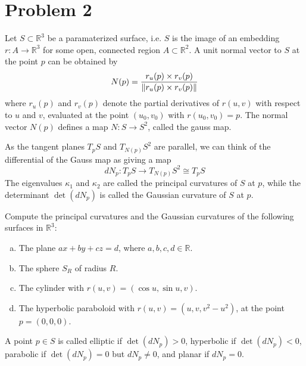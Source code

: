 \documentclass[a4paper]{article}
\begin{document}
\section*{Problem 2}%
Let $S \subset \mathds{R}^3$ be a paramaterized surface, i.e. $S$ is the image of an embedding $r: A \rightarrow \mathds{R}^3$ for some open, connected region $A \subset \mathds{R}^2$. A unit normal vector to $S$ at the point $p$ can be obtained by
\[
  N(p) = \frac{r_u(p) \times r_v(p)}{\norm{r_u(p) \times r_v(p)}}
\]
where $r_u(p)$ and $r_v(p)$ denote the partial derivatives of $r(u,v)$ with respect to $u$ and $v$, evaluated at the point $(u_0, v_0)$ with $r(u_0, v_0) = p$. The normal vector $N(p)$ defines a map $N: S \rightarrow S^2$, called the gauss map.

As the tangent planes $T_pS$ and $T_{N(p)}S^2$ are parallel, we can think of the differential of the Gauss map as giving a map
\[
  dN_p: T_pS \rightarrow T_{N(p)}S^2 \cong T_pS
\]
The eigenvalues $\kappa_1$ and $\kappa_2$ are called the principal curvatures of $S$ at $p$, while the determinant $\det(dN_p)$ is called the Gaussian curvature of $S$ at $p$.

Compute the principal curvatures and the Gaussian curvatures of the following surfaces in $\mathds{R}^3$:
\begin{enumerate}[(a)]
  \item The plane $ax + by + cz = d$, where $a,b,c,d \in \mathds{R}$.
  \item The sphere $S_R$ of radius $R$.
  \item The cylinder with $r(u,v) = (\cos u, \sin u, v)$.
  \item The hyperbolic paraboloid with $r(u,v) = (u, v, v^2 - u^2)$, at the point $p = (0,0,0)$.
\end{enumerate}

A point $p \in S$ is called elliptic if $\det(dN_p) > 0$, hyperbolic if $\det(dN_p) < 0$, parabolic if $\det(dN_p) = 0$ but $dN_p \neq 0$, and planar if $dN_p = 0$.
\end{document}
